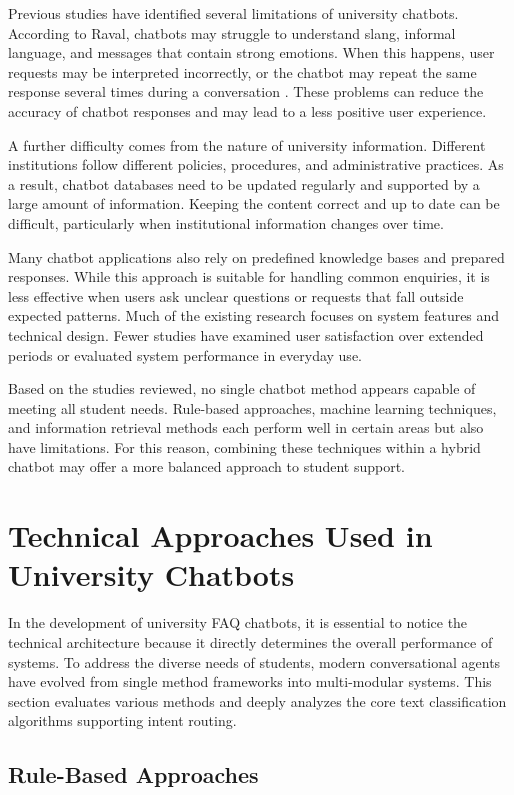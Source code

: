 \documentclass[12pt,a4paper]{article}
\begin{document}
Previous studies have identified several limitations of university chatbots. According to Raval, chatbots may struggle to understand slang, informal language, and messages that contain strong emotions. When this happens, user requests may be interpreted incorrectly, or the chatbot may repeat the same response several times during a conversation \cite{raval2020}. These problems can reduce the accuracy of chatbot responses and may lead to a less positive user experience.

A further difficulty comes from the nature of university information. Different institutions follow different policies, procedures, and administrative practices. As a result, chatbot databases need to be updated regularly and supported by a large amount of information. Keeping the content correct and up to date can be difficult, particularly when institutional information changes over time.

Many chatbot applications also rely on predefined knowledge bases and prepared responses. While this approach is suitable for handling common enquiries, it is less effective when users ask unclear questions or requests that fall outside expected patterns. Much of the existing research focuses on system features and technical design. Fewer studies have examined user satisfaction over extended periods or evaluated system performance in everyday use.

Based on the studies reviewed, no single chatbot method appears capable of meeting all student needs. Rule-based approaches, machine learning techniques, and information retrieval methods each perform well in certain areas but also have limitations. For this reason, combining these techniques within a hybrid chatbot may offer a more balanced approach to student support.

\section{Technical Approaches Used in University Chatbots}

In the development of university FAQ chatbots, it is essential to notice the technical architecture because it directly determines the overall performance of systems. To address the diverse needs of students, modern conversational agents have evolved from single method frameworks into multi-modular systems. This section evaluates various methods and deeply analyzes the core text classification algorithms supporting intent routing.

\subsection{Rule-Based Approaches}
\end{document}
